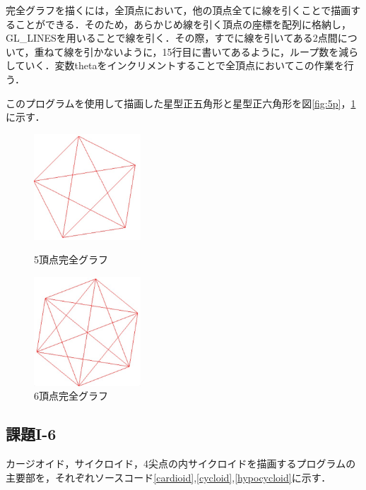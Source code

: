 \documentclass[]{jsarticle}
\begin{document}
完全グラフを描くには，全頂点において，他の頂点全てに線を引くことで描画することができる．そのため，あらかじめ線を引く頂点の座標を配列に格納し，GL\_LINESを用いることで線を引く．その際，すでに線を引いてある2点間について，重ねて線を引かないように，15行目に書いてあるように，ループ数を減らしていく．変数thetaをインクリメントすることで全頂点においてこの作業を行う．

このプログラムを使用して描画した星型正五角形と星型正六角形を図\ref{fig:5p}，\ref{fig:6p}に示す．
\begin{figure}[htbp]
\begin{center}
\begin{minipage}[b]{0.45\textwidth}
  \begin{center}
    \includegraphics[width=4cm,keepaspectratio]{5p.jpg}
    \caption{5頂点完全グラフ}
    \label{fig:5p}
  \end{center}
\end{minipage}
\begin{minipage}[b]{0.45\textwidth}
  \begin{center}
    \includegraphics[width=4cm,keepaspectratio]{6p.jpg}
    \caption{6頂点完全グラフ}
    \label{fig:6p}
  \end{center}
\end{minipage}
\end{center}
\end{figure}

\subsection{課題I-6}
カージオイド，サイクロイド，4尖点の内サイクロイドを描画するプログラムの主要部を，それぞれソースコード\ref{cardioid},\ref{cycloid},\ref{hypocycloid}に示す．
\end{document}
